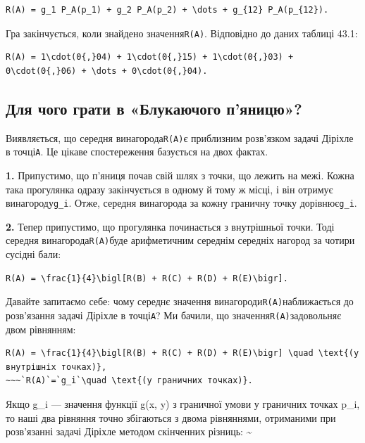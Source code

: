 \documentclass[
  ukrainian,
]{article}
\begin{document}
\begin{verbatim}
R(A) = g_1 P_A(p_1) + g_2 P_A(p_2) + \dots + g_{12} P_A(p_{12}).
\end{verbatim}

Гра закінчується, коли знайдено значення\texttt{R(A)}. Відповідно до
даних таблиці 43.1:

\begin{verbatim}
R(A) = 1\cdot(0{,}04) + 1\cdot(0{,}15) + 1\cdot(0{,}03) + 0\cdot(0{,}06) + \dots + 0\cdot(0{,}04).
\end{verbatim}

\subsection{Для чого грати в «Блукаючого
п'яницю»?}\label{ux434ux43bux44f-ux447ux43eux433ux43e-ux433ux440ux430ux442ux438-ux432-ux431ux43bux443ux43aux430ux44eux447ux43eux433ux43e-ux43fux44fux43dux438ux446ux44e}

Виявляється, що середня винагорода\texttt{R(A)}є приблизним розв'язком
задачі Діріхле в точці\texttt{A}. Це цікаве спостереження базується на
двох фактах.

\textbf{1.} Припустимо, що п'яниця почав свій шлях з точки, що лежить на
межі. Кожна така прогулянка одразу закінчується в одному й тому ж місці,
і він отримує винагороду\texttt{g\_i}. Отже, середня винагорода за кожну
граничну точку дорівнює\texttt{g\_i}.

\textbf{2.} Тепер припустимо, що прогулянка починається з внутрішньої
точки. Тоді середня винагорода\texttt{R(A)}буде арифметичним середнім
середніх нагород за чотири сусідні бали:

\begin{verbatim}
R(A) = \frac{1}{4}\bigl[R(B) + R(C) + R(D) + R(E)\bigr].
\end{verbatim}

Давайте запитаємо себе: чому середнє значення
винагороди\texttt{R(A)}наближається до розв'язання задачі Діріхле в
точці\texttt{A}? Ми бачили, що значення\texttt{R(A)}задовольняє двом
рівнянням:

\begin{verbatim}
R(A) = \frac{1}{4}\bigl[R(B) + R(C) + R(D) + R(E)\bigr] \quad \text{(у внутрішніх точках)},
~~~`R(A)`=`g_i`\quad \text{(у граничних точках)}.
\end{verbatim}

Якщо g\_i --- значення функції g(x, y) з граничної умови у граничних
точках p\_i, то наші два рівняння точно збігаються з двома рівняннями,
отриманими при розв'язанні задачі Діріхле методом скінченних різниць:
\textsubscript{}\textasciitilde{}
\end{document}
